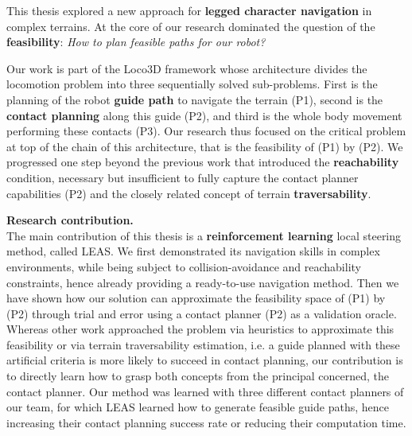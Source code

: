 

This thesis explored a new approach for \textbf{legged character navigation} in complex terrains. At the core of our research dominated the question of the \textbf{feasibility}: \textit{How to plan feasible paths for our robot?}

Our work is part of the Loco3D framework whose architecture divides the locomotion problem into three sequentially solved sub-problems. First is the planning of the robot \textbf{guide path} to navigate the terrain (P1), second is the \textbf{contact planning} along this guide (P2), and third is the whole body movement performing these contacts (P3).
Our research thus focused on the critical problem at top of the chain of this architecture, that is the feasibility of (P1) by (P2).
We progressed one step beyond the previous work \cite{RB-PRM} that introduced the \textbf{reachability} condition, necessary but insufficient to fully capture the contact planner capabilities (P2) and the closely related concept of terrain \textbf{traversability}.

\hfill \break

\noindent\textbf{Research contribution.}\\

The main contribution of this thesis is a \textbf{reinforcement learning} local steering method, called LEAS. We first demonstrated its navigation skills in complex environments, while being subject to collision-avoidance and reachability constraints, hence already providing a ready-to-use navigation method.
Then we have shown how our solution can approximate the feasibility space of (P1) by (P2) through trial and error using a contact planner (P2) as a validation oracle.
Whereas other work approached the problem via heuristics to approximate this feasibility or via terrain traversability estimation, i.e. a guide planned with these artificial criteria is more likely to succeed in contact planning, our contribution is to directly learn how to grasp both concepts from the principal concerned, the contact planner.
Our method was learned with three different contact planners of our team, for which LEAS learned how to generate feasible guide paths, hence increasing their contact planning success rate or reducing their computation time.

